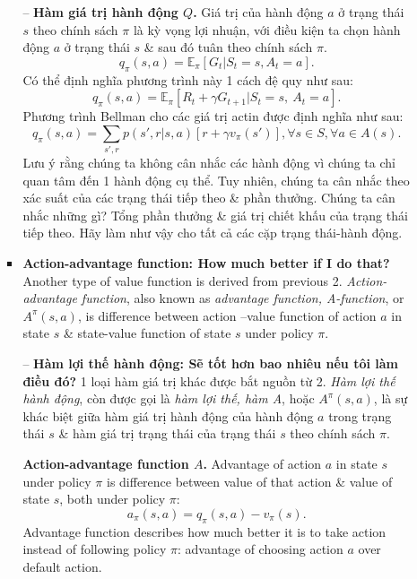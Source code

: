 \documentclass{article}
\begin{document}
\begin{itemize}
\begin{itemize}
\begin{itemize}
            -- {\bf Hàm giá trị hành động $Q$.} Giá trị của hành động $a$ ở trạng thái $s$ theo chính sách $\pi$ là kỳ vọng lợi nhuận, với điều kiện ta chọn hành động $a$ ở trạng thái $s$ \& sau đó tuân theo chính sách $\pi$.
            \begin{equation*}
                q_\pi(s,a) = \mathbb{E}_\pi[G_t|S_t = s,A_t = a].
            \end{equation*}
            Có thể định nghĩa phương trình này 1 cách đệ quy như sau:
            \begin{equation*}
                q_\pi(s,a) = \mathbb{E}_\pi[R_t + \gamma G_{t+1}|S_t = s,\ A_t = a].
            \end{equation*}
            Phương trình Bellman cho các giá trị actin được định nghĩa như sau:
            \begin{equation*}
                q_\pi(s,a) = \sum_{s',r} p(s',r|s,a)[r + \gamma v_\pi(s')], \forall s\in S, \forall a\in A(s).
            \end{equation*}
            Lưu ý rằng chúng ta không cân nhắc các hành động vì chúng ta chỉ quan tâm đến 1 hành động cụ thể. Tuy nhiên, chúng ta cân nhắc theo xác suất của các trạng thái tiếp theo \& phần thưởng. Chúng ta cân nhắc những gì? Tổng phần thưởng \& giá trị chiết khấu của trạng thái tiếp theo. Hãy làm như vậy cho tất cả các cặp trạng thái-hành động.

            \item {\bf Action-advantage function: How much better if I do that?} Another type of value function is derived from previous 2. {\it Action-advantage function}, also known as {\it advantage function, A-function}, or $A^\pi(s,a)$, is difference between action --value function of action $a$ in state $s$ \& state-value function of state $s$ under policy $\pi$.

            -- {\bf Hàm lợi thế hành động: Sẽ tốt hơn bao nhiêu nếu tôi làm điều đó?} 1 loại hàm giá trị khác được bắt nguồn từ 2. {\it Hàm lợi thế hành động}, còn được gọi là {\it hàm lợi thế, hàm A}, hoặc $A^\pi(s,a)$, là sự khác biệt giữa hàm giá trị hành động của hành động $a$ trong trạng thái $s$ \& hàm giá trị trạng thái của trạng thái $s$ theo chính sách $\pi$.

            {\bf Action-advantage function $A$.} Advantage of action $a$ in state $s$ under policy $\pi$ is difference between value of that action \& value of state $s$, both under policy $\pi$:
            \begin{equation*}
                a_\pi(s,a) = q_\pi(s,a) - v_\pi(s).
            \end{equation*}
            Advantage function describes how much better it is to take action instead of following policy $\pi$: advantage of choosing action $a$ over default action.


\end{itemize}
\end{itemize}
\end{itemize}
\end{document}
